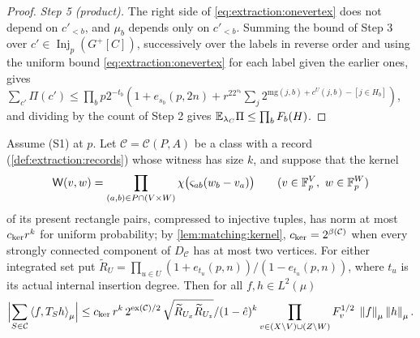 \begin{proof}
\emph{Step 5 (product).} The right side of \eqref{eq:extraction:onevertex} does not
depend on $c'_{<b}$, and $\mu_b$ depends only on $c'_{<b}$. Summing the bound of
Step 3 over $c'\in\operatorname{Inj}_p(G^+[C])$, successively over the labels in reverse order and using the uniform
bound \eqref{eq:extraction:onevertex} for each label given the earlier ones,
gives $\sum_{c'}\Pi(c')\le\prod_bp2^{-t_b}(1+e_{s_b}(p,2n)+r^22^{s_b}\sum_j
2^{\mathrm{mg}(j,b)+c^U(j,b)-[j\in H_b]})$, and dividing by the count of Step 2
gives $\mathbb E_{\lambda_C}\Pi\le\prod_bF_b(H)$.
\end{proof}

\begin{theorem}\label{lem:matching:extractionk}
Assume \textup{(S1)} at $p$. Let $\mathcal C=\mathcal C(P,A)$ be a class with a
record (\cref{def:extraction:records}) whose witness has size $k$, and suppose that
the kernel
\[
 \mathsf W(v,w)=\prod_{(a,b)\in P\cap(V\times W)}\chi\bigl(\varsigma_{ab}(w_b-v_a)\bigr)
 \qquad(v\in\mathbb F_p^V,\ w\in\mathbb F_p^W)
\]
of its present rectangle pairs, compressed to injective tuples, has norm at most
$c_{\rm ker}r^k$ for uniform probability; by \cref{lem:matching:kernel},
$c_{\rm ker}=2^{\beta(\mathcal C)}$ when every strongly connected component of
$D_{\mathcal C}$ has at most two vertices. For either integrated set put
$\widetilde R_U=\prod_{u\in U}(1+e_{t_u}(p,n))/(1-e_{t_u}(p,n))$,
where $t_u$ is its actual internal insertion degree. Then for all $f,h\in L^2(\mu)$
\[
 \Bigl|\sum_{S\in\mathcal C}\left\langle f,T_Sh\right\rangle_\mu\Bigr|
 \le c_{\rm ker}\,r^k\,2^{\mathrm{ex}(\mathcal C)/2}\,
 \sqrt{\widetilde R_{U_x}\widetilde R_{U_z}}/(1-\hat e)^k
 \prod_{v\in(X\setminus V)\cup(Z\setminus W)}F_v^{1/2}\;\left\|f\right\|_\mu\left\|h\right\|_\mu .
\]
\end{theorem}

